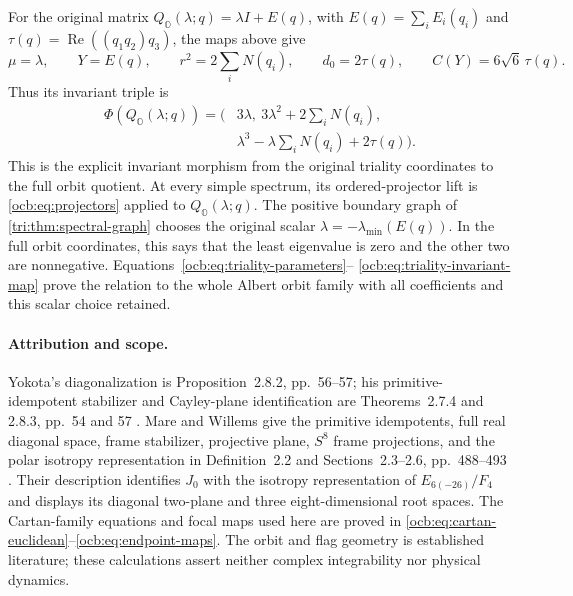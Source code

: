 \documentclass[11pt]{article}
\theoremstyle{definition}
\begin{document}
For the original matrix
$Q_{\mathbb O}(\lambda;q)=\lambda I+E(q)$, with
$E(q)=\sum_iE_i(q_i)$ and
$\tau(q)=\operatorname{Re}((q_1q_2)q_3)$, the maps above give
\begin{equation}
 \mu=\lambda,\qquad Y=E(q),\qquad
 r^2=2\sum_iN(q_i),\qquad d_0=2\tau(q),\qquad
 C(Y)=6\sqrt6\,\tau(q).
 \label{ocb:eq:triality-parameters}\tag{OCB36}
\end{equation}
Thus its invariant triple is
\begin{equation}
 \begin{aligned}
 \Phi(Q_{\mathbb O}(\lambda;q))
 =\bigl(&3\lambda,\ 3\lambda^2+2\sum_iN(q_i),\\
        &\lambda^3-\lambda\sum_iN(q_i)+2\tau(q)\bigr).
 \end{aligned}
 \label{ocb:eq:triality-invariant-map}\tag{OCB37}
\end{equation}
This is the explicit invariant morphism from the original triality
coordinates to the full orbit quotient. At every simple spectrum,
its ordered-projector lift is \eqref{ocb:eq:projectors} applied to
$Q_{\mathbb O}(\lambda;q)$. The positive boundary graph of
\cref{tri:thm:spectral-graph} chooses the original scalar
$\lambda=-\lambda_{\min}(E(q))$. In the full orbit coordinates,
this says that the least eigenvalue is zero and the other two are
nonnegative. Equations~\eqref{ocb:eq:triality-parameters}--
\eqref{ocb:eq:triality-invariant-map} prove the relation to the whole
Albert orbit family with all coefficients and this scalar choice
retained.

\paragraph{Attribution and scope.}
Yokota's diagonalization is Proposition~2.8.2, pp.~56--57;
his primitive-idempotent stabilizer and Cayley-plane identification
are Theorems~2.7.4 and 2.8.3, pp.~54 and 57
\cite{Yokota2009}. Mare and Willems give the primitive idempotents,
full real diagonal space, frame stabilizer, projective plane,
$S^8$ frame projections, and the polar isotropy representation
in Definition~2.2 and Sections~2.3--2.6, pp.~488--493
\cite{MareWillems2013}. Their description identifies $J_0$ with
the isotropy representation of $E_{6(-26)}/F_4$ and displays its
diagonal two-plane and three eight-dimensional root spaces. The
Cartan-family equations and focal maps used here are proved in
\eqref{ocb:eq:cartan-euclidean}--\eqref{ocb:eq:endpoint-maps}.
The orbit and flag geometry is established literature; these
calculations assert neither complex integrability nor physical
dynamics.
\end{document}
